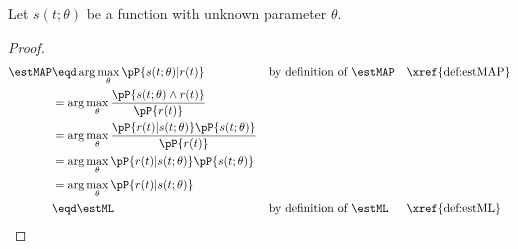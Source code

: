 \begin{theorem}
\label{thm:map=ml}
Let $s(t;\theta)$ be a function with unknown parameter $\theta$.
\end{theorem}
\begin{proof}
\begin{align*}
   \estMAP
     &\eqd \arg\max_\theta \pP{s(t;\theta)|r(t)}
     &&    \text{by definition of $\estMAP$}
     &&    \text{\xref{def:estMAP}}
   \\&=    \arg\max_\theta \frac{\pP{s(t;\theta) \land r(t)}}
                               {\pP{r(t)}}
   \\&=    \arg\max_\theta \frac{\pP{r(t) | s(t;\theta) }\pP{s(t;\theta) }}
                               {\pP{r(t)}}
   \\&=    \arg\max_\theta \pP{r(t) | s(t;\theta) }\pP{s(t;\theta) }
   \\&=    \arg\max_\theta \pP{r(t) | s(t;\theta) }
   \\&\eqd \estML
     &&  \text{by definition of $\estML$}
     &&  \text{\xref{def:estML}}
\end{align*}
\end{proof}




